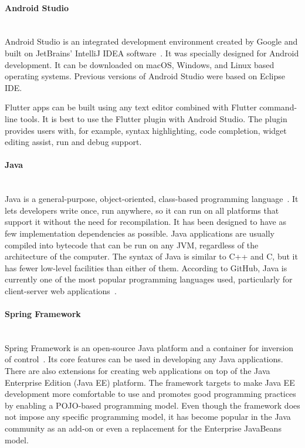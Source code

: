 \paragraph{\large{Android Studio}}\mbox{}\\[2pt]
Android Studio is an integrated development environment created by Google and built on JetBrains' IntelliJ IDEA software~\cite{android-studio}. It was specially designed for Android development. It can be downloaded on macOS, Windows, and Linux based operating systems. Previous versions of Android Studio were based on Eclipse IDE.

Flutter apps can be built using any text editor combined with Flutter command-line tools. It is best to use the Flutter plugin with Android Studio. The plugin provides users with, for example, syntax highlighting, code completion, widget editing assist, run and debug support.

\paragraph{\large{Java}}\mbox{}\\[2pt]
Java is a general-purpose, object-oriented, class-based programming language~\cite{java}. It lets developers write once, run anywhere, so it can run on all platforms that support it without the need for recompilation.  It has been designed to have as few implementation dependencies as possible. Java applications are usually compiled into bytecode that can be run on any JVM, regardless of the architecture of the computer. The syntax of Java is similar to C++ and C, but it has fewer low-level facilities than either of them. According to GitHub, Java is currently one of the most popular programming languages used, particularly for client-server web applications~\cite{java-wiki}.

\paragraph{\large{Spring Framework}}\mbox{}\\[2pt]
Spring Framework is an open-source Java platform and a container for inversion of control~\cite{spring}. Its core features can be used in developing any Java applications. There are also extensions for creating web applications on top of the Java Enterprise Edition (Java EE) platform. The framework targets to make Java EE development more comfortable to use and promotes good programming practices by enabling a POJO-based programming model. Even though the framework does not impose any specific programming model, it has become popular in the Java community as an add-on or even a replacement for the Enterprise JavaBeans model.

